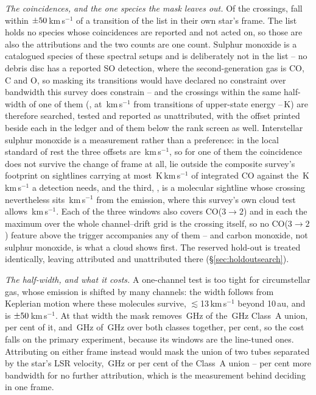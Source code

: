 \emph{The coincidences, and the one species the mask leaves out.} Of the
\NCross{} crossings, \MkNCoinc{} fall within $\pm50$\,km\,s$^{-1}$
of a transition of the list in their own star's frame. The list holds no
species whose coincidences are reported and not acted on, so those are also
the \MkAttr{} attributions and the two counts are one count. Sulphur monoxide
is a catalogued species of these spectral setups and is deliberately not in
the list -- no debris disc has a reported SO detection, where the
second-generation gas is CO, C and O, so masking its \SoNTrans{} transitions
would have declared no constraint over bandwidth this survey does constrain --
and the \SoNCrossWord{} crossings within the same half-width of one of them
(\SoStars, at \SoDvList\,km\,s$^{-1}$ from transitions of upper-state energy
\SoEuLo--\SoEuHi\,K) are therefore searched, tested and reported as
unattributed, with the offset printed beside each in the ledger and
\SoNBelowScreen{} of them below the rank screen as well. Interstellar sulphur
monoxide is a measurement rather than a preference: in the local standard of
rest the three offsets are \SoDvLsrList\,km\,s$^{-1}$, so for one of them the
coincidence does not survive the change of frame at all, \SoNUncovered{} lie
outside the composite survey's footprint on sightlines carrying at most
\SoPlanckMax\,K\,km\,s$^{-1}$ of integrated CO against the
\SoPlanckCeil\,K\,km\,s$^{-1}$ a detection needs, and the third,
\SoCloudStar, is a molecular sightline whose crossing nevertheless sits
\SoCloudDv\,km\,s$^{-1}$ from the emission, where this survey's own cloud test
allows \LsCloudDvMax\,km\,s$^{-1}$. Each of the three windows also covers
CO($3\to2$) and in each the maximum over the whole channel--drift grid is the
crossing itself, so no CO($3\to2$) feature above the trigger accompanies any
of them -- and carbon monoxide, not sulphur monoxide, is what a cloud shows
first. The reserved hold-out is treated identically, leaving \HoNAttr{}
attributed and \HoNUnattr{} unattributed there
(\S\ref{sec:holdoutsearch}).

\emph{The half-width, and what it costs.} A one-channel test is too tight for
circumstellar gas, whose emission is shifted by many channels: the width
follows from Keplerian motion where these molecules survive,
$\lesssim$13\,km\,s$^{-1}$ beyond 10\,au, and is
$\pm50$\,km\,s$^{-1}$. At that width the mask removes
\MkMaskAGHz\,GHz of the \CvUnionA\,GHz Class~A union, \MkMaskAPct{} per cent
of it, and \FrMaskLostGHz\,GHz of \FrMaskUnionGHz\,GHz over both classes
together, \FrMaskPct{} per cent, so the cost falls on the primary
experiment, because its windows are the line-tuned ones.
Attributing on either frame instead would mask the union of two tubes
separated by the star's LSR velocity, \LsMaskTwoGHz\,GHz or
\LsMaskTwoPct{} per cent of the Class~A union -- \LsMaskAddPct{} per cent
more bandwidth for no further attribution, which is the measurement behind
deciding in one frame.

